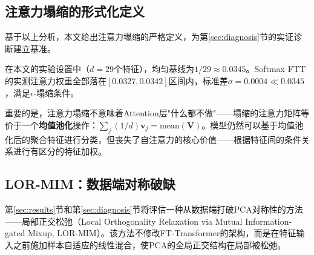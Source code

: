 \subsection{注意力塌缩的形式化定义}

基于以上分析，本文给出注意力塌缩的严格定义，为第\ref{sec:diagnosis}节的实证诊断建立基准。

\begin{center}
\end{center}

在本文的实验设置中（$d=29$个特征），均匀基线为$1/29 \approx 0.0345$。Softmax FTT的实测注意力权重全部落在$[0.0327, 0.0342]$区间内，标准差$\sigma = 0.0004 \ll 0.0345$，满足$\epsilon$-塌缩条件。

重要的是，注意力塌缩不意味着Attention层"什么都不做"——塌缩的注意力矩阵等价于一个\textbf{均值池化}操作：$\sum_j (1/d) \mathbf{v}_j = \text{mean}(\mathbf{V})$。模型仍然可以基于均值池化后的聚合特征进行分类，但丧失了自注意力的核心价值——根据特征间的条件关系进行有区分的特征加权。

\subsection{LOR-MIM：数据端对称破缺}

第\ref{sec:results}节和第\ref{sec:diagnosis}节将评估一种从数据端打破PCA对称性的方法——局部正交松弛（Local Orthogonality Relaxation via Mutual Information-gated Mixup, LOR-MIM）。该方法不修改FT-Transformer的架构，而是在特征输入之前施加样本自适应的线性混合，使PCA的全局正交结构在局部被松弛。

